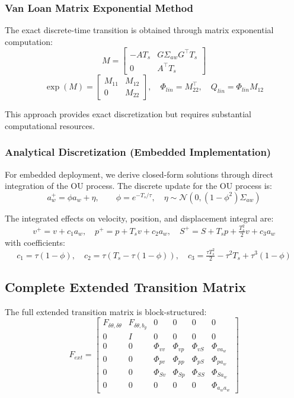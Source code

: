 \documentclass[11pt,letterpaper]{article}
\begin{document}
\subsubsection{Van Loan Matrix Exponential Method}

The exact discrete-time transition is obtained through matrix exponential computation:
\[
M = \begin{bmatrix}
-AT_s & G\Sigma_{aw}G^\top T_s \\
0 & A^\top T_s
\end{bmatrix}
\]
\[
\exp(M) = \begin{bmatrix} M_{11} & M_{12} \\ 0 & M_{22}\end{bmatrix},\quad
\Phi_{lin}=M_{22}^\top,\quad Q_{lin}=\Phi_{lin} M_{12}
\]

This approach provides exact discretization but requires substantial computational resources.

\subsubsection{Analytical Discretization (Embedded Implementation)}

For embedded deployment, we derive closed-form solutions through direct integration of the OU process. The discrete update for the OU process is:
\[
a_w^+ = \phi a_w + \eta,\qquad
\phi=e^{-T_s/\tau},\quad
\eta\sim\mathcal{N}(0,(1-\phi^2)\Sigma_{aw})
\]

The integrated effects on velocity, position, and displacement integral are:
\[
v^+ = v + c_1 a_w,\quad
p^+ = p + T_s v + c_2 a_w,\quad
S^+ = S + T_s p + \tfrac{T_s^2}{2}v + c_3 a_w
\]
with coefficients:
\[
c_1=\tau(1-\phi),\quad
c_2=\tau\!\left(T_s-\tau(1-\phi)\right),\quad
c_3=\tfrac{\tau T_s^2}{2}-\tau^2T_s+\tau^3(1-\phi)
\]

\subsection{Complete Extended Transition Matrix}

The full extended transition matrix is block-structured:
\[
F_{ext} =
\begin{bmatrix}
F_{\delta\theta,\delta\theta} & F_{\delta\theta,b_g} & 0 & 0 & 0 & 0 \\
0 & I & 0 & 0 & 0 & 0 \\
0 & 0 & \Phi_{vv} & \Phi_{vp} & \Phi_{vS} & \Phi_{va_w} \\
0 & 0 & \Phi_{pv} & \Phi_{pp} & \Phi_{pS} & \Phi_{pa_w} \\
0 & 0 & \Phi_{Sv} & \Phi_{Sp} & \Phi_{SS} & \Phi_{Sa_w} \\
0 & 0 & 0 & 0 & 0 & \Phi_{a_w a_w}
\end{bmatrix}
\]
\end{document}
